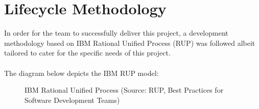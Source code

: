 \documentclass[12pt]{article} %
\begin{document}
	
	
	
	
	
	

	
	
	\section{Lifecycle Methodology}
	
	
	In order for the team to successfully deliver this project, a development methodology based on IBM Rational Unified Process (RUP) was followed albeit tailored to cater for the specific needs of this project.\\
	\\
	The diagram below depicts the IBM RUP model:
	
		\begin{figure}[H] %
			\caption{IBM Rational Unified Process (Source: RUP, Best Practices for Software Development Teams)}
			\label{fig:speciation}
		\end{figure}
		
\end{document}
